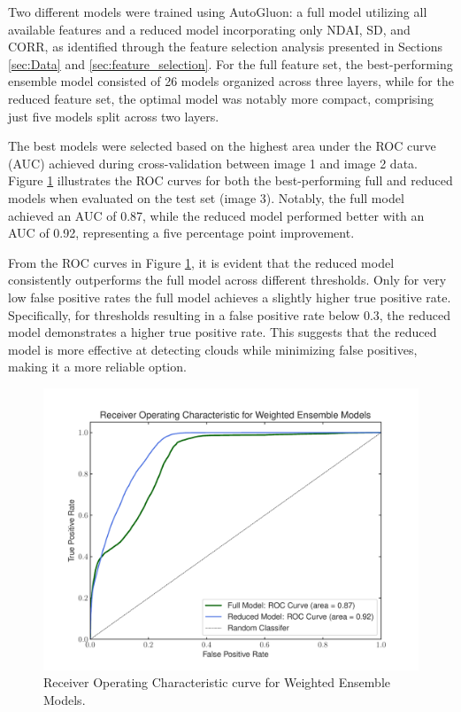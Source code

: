 \documentclass[11pt,letterpaper]{article}
\begin{document}
Two different models were trained using AutoGluon: a full model utilizing all available features and a reduced model incorporating only NDAI, SD, and CORR, as identified through the feature selection analysis presented in Sections \ref{sec:Data} and \ref{sec:feature_selection}. For the full feature set, the best-performing ensemble model consisted of 26 models organized across three layers, while for the reduced feature set, the optimal model was notably more compact, comprising just five models split across two layers.

The best models were selected based on the highest area under the ROC curve (AUC) achieved during cross-validation between image 1 and image 2 data. Figure \ref{fig_roc_ensemble} illustrates the ROC curves for both the best-performing full and reduced models when evaluated on the test set (image 3). Notably, the full model achieved an AUC of 0.87, while the reduced model performed better with an AUC of 0.92, representing a five percentage point improvement.

From the ROC curves in Figure \ref{fig_roc_ensemble}, it is evident that the reduced model consistently outperforms the full model across different thresholds. Only for very low false positive rates the full model achieves a slightly higher true positive rate. Specifically, for thresholds resulting in a false positive rate below 0.3, the reduced model demonstrates a higher true positive rate. This suggests that the reduced model is more effective at detecting clouds while minimizing false positives, making it a more reliable option.

\begin{figure}[H]
    \centering
    \includegraphics[width=0.9\linewidth]{figs/roc_ensemble.pdf}
    \caption{Receiver Operating Characteristic curve for Weighted Ensemble Models.}
    \label{fig_roc_ensemble}
\end{figure}
\end{document}
